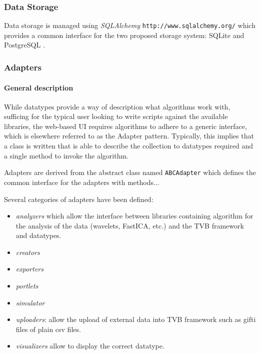 \subsubsection{Data Storage}

Data storage is managed using \emph{SQLAlchemy}
\texttt{http://www.sqlalchemy.org/} which provides a common interface for the
two proposed storage system: SQLite and PostgreSQL .

\subsubsection{Adapters}

\paragraph{General description}

While datatypes provide a way of description what algorithms work with, 
sufficing for the typical user looking to write scripts against the
available libraries, the web-based UI requires algorithms to adhere to 
a generic interface, which is elsewhere referred to as the Adapter pattern.
Typically, this implies that a class is written that is able to describe
the collection to datatypes required and a single method to invoke the
algorithm.

Adapters are derived from the abstract class named \texttt{ABCAdapter} which
defines the common interface for the adapters with methods...

Several categories of adapters have been defined: 
\begin{itemize}
    \item \textit{analyzers} which allow the interface between libraries
        containing algorithm for the analysis of the data (wavelets, FastICA,
        etc.) and the TVB framework and datatypes.
    \item \textit{creators}
    \item \textit{exporters} 
    \item \textit{portlets} 
    \item \textit{simulator}
\item \textit{uploaders}: allow the upload of external data into TVB framework
    such as gifti files of plain csv files.
\item \textit{visualizers}  allow
    to display the correct datatype.
\end{itemize}


